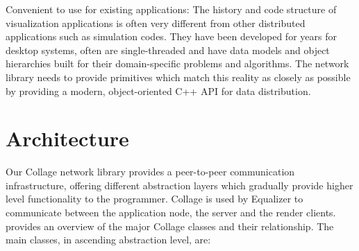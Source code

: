 \begin{compactdesc}
\item[Convenient to use for existing applications:] The history and code
structure of visualization applications is often very different from other
distributed applications such as simulation codes. They have been developed for
years for desktop systems, often are single-threaded and have data models and
object hierarchies built for their domain-specific problems and algorithms. The
network library needs to provide primitives which match this reality as closely
as possible by providing a modern, object-oriented C++ API for data
distribution.

\end{compactdesc}


\section{Architecture}

Our Collage network library provides a peer-to-peer communication
infrastructure, offering different abstraction layers which gradually provide
higher level functionality to the programmer. Collage is used by Equalizer to
communicate between the application node, the server and the render clients.
 provides an overview of the major Collage classes and their
relationship. The main classes, in ascending abstraction level, are:

